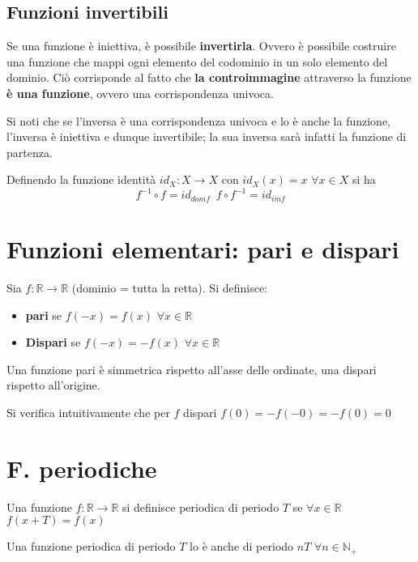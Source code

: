 \documentclass[10pt, oneside]{book}
\theoremstyle{plain}
\begin{document}
\subsection{Funzioni invertibili}
\begin{prop}
Se una funzione è iniettiva, è possibile \textbf{invertirla}. Ovvero è possibile costruire una funzione che mappi ogni elemento del codominio in un solo elemento del dominio. Ciò corrisponde al fatto che \textbf{la controimmagine} attraverso la funzione \textbf{è una funzione}, ovvero una corrispondenza univoca.
\end{prop}
\begin{oss}
Si noti che se l'inversa è una corrispondenza univoca e lo è anche la funzione, l'inversa è iniettiva e dunque invertibile; la sua inversa sarà infatti la funzione di partenza.
\end{oss}
Definendo la funzione identità $id_X : X \rightarrow X$ con $id_X (x) = x$ $\forall x \in X$ si ha
\[f^{-1} \circ f = id_{dom f} \enspace f \circ f^{-1} = id_{im f}\]

\section{Funzioni elementari: pari e dispari}
\begin{defin}
    Sia $f : \mathbb{R} \rightarrow \mathbb{R}$ (dominio = tutta la retta). Si definisce:
    \begin{itemize}[label = $\square$]
        \item \textbf{pari} se $f(-x) = f(x)$ $\forall x \in \mathbb{R}$
        \item \textbf{Dispari} se $f(-x) = - f(x)$ $\forall x \in \mathbb{R}$
    \end{itemize}
    Una funzione pari è simmetrica rispetto all'asse delle ordinate, una dispari rispetto all'origine.
\end{defin}
Si verifica intuitivamente che per $f$ dispari $f(0) = - f(-0) = - f(0) = 0$

\section{F. periodiche}
\begin{defin}
    Una funzione $f : \mathbb{R} \rightarrow \mathbb{R}$ si definisce periodica di periodo $T$ se $\forall x \in \mathbb{R}$ $f(x+T) = f(x)$
    \end{defin}
    Una funzione periodica di periodo $T$ lo è anche di periodo $nT$ $\forall n \in \mathbb{N}_+$
\end{document}

